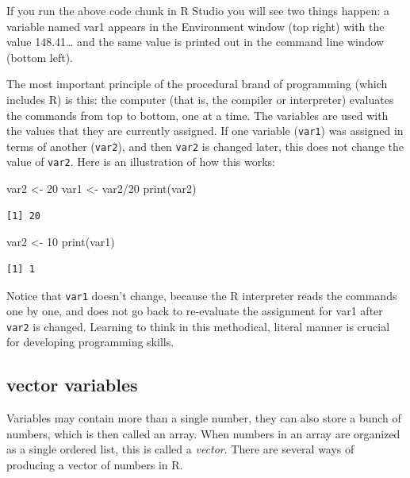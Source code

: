 \documentclass[
  letterpaper,
  DIV=11,
  numbers=noendperiod]{scrreprt}
\newenvironment{Shaded}{\begin{snugshade}}{\end{snugshade}}
\newcommand{\DecValTok}[1]{\textcolor[rgb]{0.68,0.00,0.00}{#1}}
\newcommand{\FunctionTok}[1]{\textcolor[rgb]{0.28,0.35,0.67}{#1}}
\newcommand{\NormalTok}[1]{\textcolor[rgb]{0.00,0.23,0.31}{#1}}
\newcommand{\OtherTok}[1]{\textcolor[rgb]{0.00,0.23,0.31}{#1}}
\newcommand{\SpecialCharTok}[1]{\textcolor[rgb]{0.37,0.37,0.37}{#1}}
\begin{document}
If you run the above code chunk in R Studio you will see two things
happen: a variable named var1 appears in the Environment window (top
right) with the value 148.41\ldots{} and the same value is printed out
in the command line window (bottom left).

The most important principle of the procedural brand of programming
(which includes R) is this: the computer (that is, the compiler or
interpreter) evaluates the commands from top to bottom, one at a time.
The variables are used with the values that they are currently assigned.
If one variable (\texttt{var1}) was assigned in terms of another
(\texttt{var2}), and then \texttt{var2} is changed later, this does not
change the value of \texttt{var2}. Here is an illustration of how this
works:

\begin{Shaded}
\begin{Highlighting}[]
\NormalTok{var2 }\OtherTok{\textless{}{-}} \DecValTok{20}
\NormalTok{var1 }\OtherTok{\textless{}{-}}\NormalTok{ var2}\SpecialCharTok{/}\DecValTok{20}
\FunctionTok{print}\NormalTok{(var2)}
\end{Highlighting}
\end{Shaded}

\begin{verbatim}
[1] 20
\end{verbatim}

\begin{Shaded}
\begin{Highlighting}[]
\NormalTok{var2 }\OtherTok{\textless{}{-}} \DecValTok{10}
\FunctionTok{print}\NormalTok{(var1)}
\end{Highlighting}
\end{Shaded}

\begin{verbatim}
[1] 1
\end{verbatim}

Notice that \texttt{var1} doesn't change, because the R interpreter
reads the commands one by one, and does not go back to re-evaluate the
assignment for var1 after \texttt{var2} is changed. Learning to think in
this methodical, literal manner is crucial for developing programming
skills.

\hypertarget{vector-variables}{%
\subsection{vector variables}\label{vector-variables}}

Variables may contain more than a single number, they can also store a
bunch of numbers, which is then called an array. When numbers in an
array are organized as a single ordered list, this is called a
 \emph{vector}.
There are several ways of producing a vector of numbers in R.
\end{document}
